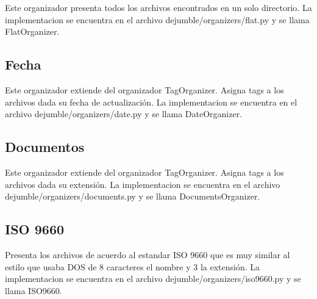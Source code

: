 Este organizador presenta todos los archivos encontrados en un solo directorio. La implementacion se encuentra en el archivo dejumble/organizers/flat.py y se llama FlatOrganizer.

\subsection{Fecha}

Este organizador extiende del organizador TagOrganizer. Asigna tags a los archivos dada su fecha de actualización. La implementacion se encuentra en el archivo dejumble/organizers/date.py y se llama DateOrganizer.

\subsection{Documentos}

Este organizador extiende del organizador TagOrganizer. Asigna tags a los archivos dada su extensión. La implementacion se encuentra en el archivo dejumble/organizers/documents.py y se llama DocumentsOrganizer.

\subsection{ISO 9660}

Presenta los archivos de acuerdo al estandar ISO 9660 que es muy similar al estilo que usaba DOS de 8 caracteres el nombre y 3 la extensión. La implementacion se encuentra en el archivo dejumble/organizers/iso9660.py y se llama ISO9660.


